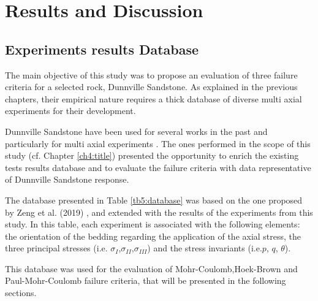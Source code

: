 \chapter{Results and Discussion}\label{ch5:chapter5}


\section{Experiments results Database }\label{ch5:database}

The main objective of this study was to propose an evaluation of three failure criteria for a selected rock, Dunnville Sandstone. As explained in the previous chapters, their empirical nature requires a thick database of diverse multi axial experiments for their development. 

Dunnville Sandstone have been used for several works in the past and particularly for multi axial experiments \cite{Labuz2018}\cite{Zeng2019}\cite{Tarokh2016}. The ones performed in the scope of this study (cf. Chapter \ref{ch4:title}) presented the opportunity to enrich the existing tests results database and to evaluate the failure criteria with data representative of Dunnville Sandstone response.

The database presented in Table \ref{tb5:database} was based on the one proposed by Zeng et al. (2019) \cite{Zeng2019}, and extended with the results of the experiments from this study. In this table, each experiment is associated with the following elements: the orientation of the bedding regarding the application of the axial stress, the three principal stresses (i.e. $\sigma_I$,$\sigma_{II}$,$\sigma_{III}$) and the stress invariants (i.e.$p$, $q$, $\theta$).

This database was used for the evaluation of Mohr-Coulomb,Hoek-Brown and Paul-Mohr-Coulomb failure criteria, that will be presented in the following sections.

